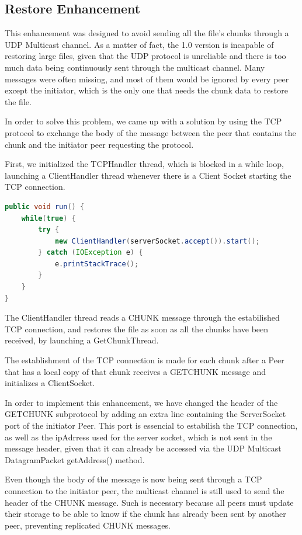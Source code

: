 \documentclass[11pt]{article}
\begin{document}
\pagebreak

\subsection{Restore Enhancement}

This enhancement was designed to avoid sending all the file's chunks through a UDP Multicast channel. As a matter of fact, the 1.0 version is incapable of restoring large files, given that the UDP protocol is unreliable and there is too much data being continuously sent through the multicast channel. Many messages were often missing, and most of them would be ignored by every peer except the initiator,
which is the only one that needs the chunk data to restore the file.

In order to solve this problem, we came up with a solution by using the TCP protocol to exchange the body of the message between the peer that contains the chunk and the initiator peer requesting the protocol.

First, we initialized the TCPHandler thread, which is blocked in a while loop, launching a ClientHandler thread whenever there is a Client Socket starting the TCP connection.

\begin{lstlisting}[language=java]
public void run() {
	while(true) {
		try {
			new ClientHandler(serverSocket.accept()).start();
		} catch (IOException e) {
			e.printStackTrace();
		}
	}
}
\end{lstlisting}

The ClientHandler thread reads a CHUNK message through the estabilished TCP connection, and restores the file as soon as all the chunks have been received, by launching a GetChunkThread.

The establishment of the TCP connection is made for each chunk after a Peer that has a local copy of that chunk receives a GETCHUNK message and initializes a ClientSocket.

In order to implement this enhancement, we have changed the header of the GETCHUNK subprotocol by adding an extra line containing the ServerSocket port of the initiator Peer.
This port is essencial to estabilish the TCP connection, as well as the ipAdrress used for the server socket, which is not sent in the message header, given that it can already be accessed
via the UDP Multicast DatagramPacket getAddress() method.

Even though the body of the message is now being sent through a TCP connection to the initiator peer, the multicast channel is still used to send the header of the 
CHUNK message. Such is necessary because all peers must update their storage to be able to know if the chunk has already been sent by another peer, preventing replicated CHUNK messages.
\end{document}
